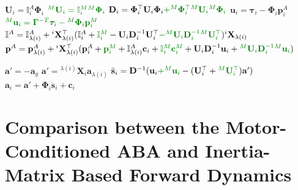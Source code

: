 \begin{algorithm}
\begin{algorithmic}[1]
        \item[]
        \State $\mathbf{U}_i = \mathbb{I} _i ^A \boldsymbol{\Phi}_i$
        \State $\color{webgreen}{{}^M\mathbf{U}_i = \mathbb{I} _i ^M {}^M\boldsymbol{\Phi}_i}$
        \State $\mathbf{D} _i = \boldsymbol{\Phi} ^\top _i  {} \mathbf{U} _i \boldsymbol{\Phi} _i \textcolor{webgreen}{+ {} ^M\boldsymbol{\Phi} ^\top _i  {} ^M\mathbf{U} _i {} ^M\boldsymbol{\Phi} _i}$
        \State $\mathbf{u}_i = \boldsymbol{\tau}_i - \boldsymbol{\Phi}_i\mathbf{p}_i^A$
        \State $\color{webgreen}{{}^M\mathbf{u}_i = \boldsymbol{\Gamma}^{-T}\boldsymbol{\tau}_i - {}^M\boldsymbol{\Phi}_i\mathbf{p}_i^M}$
        \State $\mathbb{I} ^A = \mathbb{I} ^A _{\lambda (i)} + {}^i\mathbf{X} _{\lambda (i)} ^\top (\mathbb{I} _i ^A + \textcolor{webgreen}{\mathbb{I} _i ^M } - {}  \mathbf{U} _i  \mathbf{D} ^{-1} _i  {}  \mathbf{U} ^\top _i \textcolor{webgreen}{- {} ^M \mathbf{U} _i  \mathbf{D} ^{-1} _i {} ^M \mathbf{U} ^\top _i}) {} ^i \mathbf{X} _{\lambda (i)} $
        \State $\mathbf{p} ^A = \mathbf{p} ^A _{\lambda (i)} + {}^i\mathbf{X} _{\lambda (i)} ^\top (\mathbf{p} ^A_i + \textcolor{webgreen}{\mathbf{p} ^M_i } + \mathbb{I} ^A _{\lambda (i)}  \mathbf{c}_i + \textcolor{webgreen}{\mathbb{I} {} ^M _i \mathbf{c} ^M _i }+ {}  \mathbf{U} _i \mathbf{D} ^{-1} _i {} \mathbf{u} _i + \textcolor{webgreen}{{} ^M \mathbf{U} _i \mathbf{D} ^{-1} _i {} ^M\mathbf{u} _i}) $
        \EndIf
        \EndFor

        \item[]
        \State $\mathbf{a}' = -\mathbf{a}_g$
        \Else
        \State $\mathbf{a}' = {}^{\lambda(i)}\mathbf{X}_i \mathbf{a}_{\lambda(i)}$
        \State $\ddot{\mathbf{s}}_i = \mathbf{D}^{-1} (\mathbf{u}_i \textcolor{webgreen}{+ {}^M\mathbf{u}_i }- (\mathbf{U}_i^\top + \textcolor{webgreen}{{}^M\mathbf{U}_i^\top})\mathbf{a}')$
        \State $\mathbf{a}_i = \mathbf{a}' + \boldsymbol{\Phi}_i\mathbf{\ddot{s}}_i + \mathbf{c} _i$
        \EndIf
        \EndFor
    \end{algorithmic}
\end{algorithm}

\section{Comparison between the Motor-Conditioned ABA and Inertia-Matrix Based Forward Dynamics}

